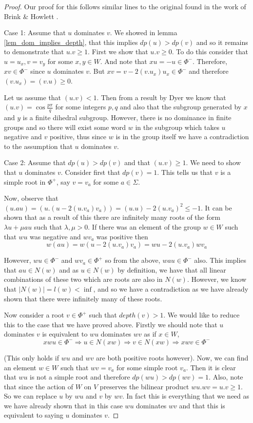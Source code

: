 \documentclass[a4paper,12pt]{article}
\begin{document}
\begin{proof}
	Our proof for this follows similar lines to the original found in the work of Brink \& Howlett \cite{brinkhowlett93}.
	
	Case 1: Assume that $u$ dominates $v$. We showed in lemma \ref{lem_dom_implies_depth}, that this implies $dp(u) > dp(v)$ and so it remains to demonstrate that $u.v \geq 1$. First we show that $u.v \geq 0$. To do this consider that $u = u_x, v = v_y$ for some $x,y \in W$. And note that $xu = -u \in \Phi^-$. Therefore, $xv \in \Phi^-$ since $u$ dominates $v$. But $xv = v - 2(v.u_x)u_x \in \Phi^-$ and therefore $(v.u_x) = (v.u) \geq 0$.
	
	Let us assume that $(u.v) < 1$. Then from a result by Dyer \cite{dyer87} we know that $(u.v) = \cos{\frac{p\pi}{q}}$ for some integers $p, q$ and also that the subgroup generated by $x$ and $y$ is a finite dihedral subgroup. However, there is no dominance in finite groups and so there will exist some word $w$ in the subgroup which takes $u$ negative and $v$ positive, thus since $w$ is in the group itself we have a contradiction to the assumption that $u$ dominates $v$.
	
	Case 2: Assume that $dp(u) > dp(v)$ and that $(u.v) \geq 1$. We need to show that $u$ dominates $v$. Consider first that $dp(v) = 1$. This tells us that $v$ is a simple root in $\Phi^+$, say $v = v_a$ for some $a \in \Sigma$. 
	
	Now, observe that $(u.au) = (u.(u - 2(u.v_a)v_a)) = (u.u) - 2(u.v_a)^2 \leq -1$. It can be shown that as a result of this there are infinitely many roots of the form $\lambda u + \mu au$ such that $\lambda, \mu > 0$. If there was an element of the group $w \in W$ such that $wu$ was negative and $wv_a$ was positive then
	\[w(au) = w(u - 2(u . v_a)v_a) = wu - 2(u.v_a)wv_a\]
	
	However, $wu \in \Phi^-$ and $wv_a \in \Phi^+$ so from the above, $wau \in \Phi^-$ also. This implies that $au \in N(w)$ and as $u \in N(w)$ by definition, we have that all linear combinations of these two which are roots are also in $N(w)$. However, we know that $\left|N(w)\right| = l(w) < \inf$, and so we have a contradiction as we have already shown that there were infinitely many of these roots.
	
	Now consider a root $v \in \Phi^+$ such that $depth(v) > 1$. We would like to reduce this to the case that we have proved above. Firstly we should note that $u$ dominates $v$ is equivalent to $wu$ dominates $wv$ as if $x \in W$, 
	\[xwu \in \Phi^- \Rightarrow u \in N(xw) \Rightarrow v \in N(xw) \Rightarrow xwv \in \Phi^-\]
	
	(This only holds if $wu$ and $wv$ are both positive roots however). Now, we can find an element $w \in W$ such that $wv = v_a$ for some simple root $v_a$. Then it is clear that $wu$ is not a simple root and therefore $dp(wu) > dp(wv) = 1$. Also, note that since the action of $W$ on $V$ preserves the bilinear product $wu.wv = u.v \geq 1$. So we can replace $u$ by $wu$ and $v$ by $wv$. In fact this is everything that we need as we have already shown that in this case $wu$ dominates $wv$ and that this is equivalent to saying $u$ dominates $v$.
\end{proof}
\end{document}
